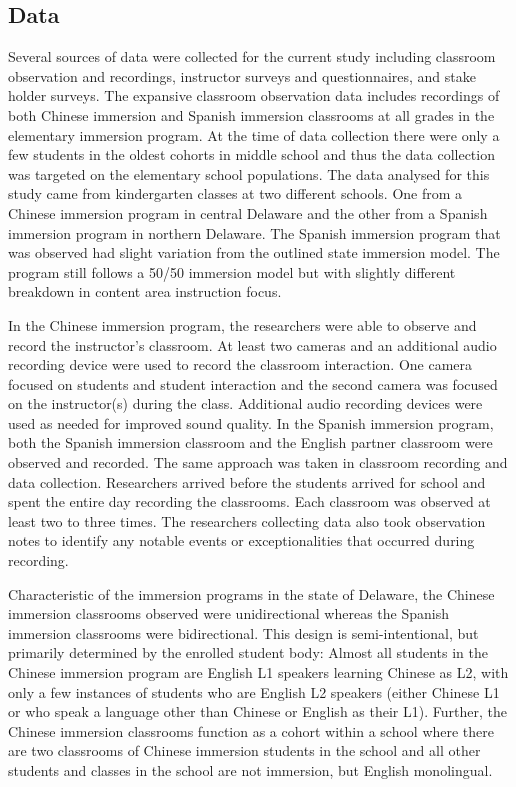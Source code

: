 \documentclass[output=paper,chinesefont]{langscibook}
\begin{document}
\subsection{Data}

Several sources of data were collected for the current study including classroom observation and recordings, instructor surveys and questionnaires, and stake holder surveys. The expansive classroom observation data includes recordings of both Chinese immersion and Spanish immersion classrooms at all grades in the elementary immersion program. At the time of data collection there were only a few students in the oldest cohorts in middle school and thus the data collection was targeted on the elementary school populations. The data analysed for this study came from kindergarten classes at two different schools. One from a Chinese immersion program in central Delaware and the other from a Spanish immersion program in northern Delaware. The Spanish immersion program that was observed had slight variation from the outlined state immersion model. The program still follows a 50/50 immersion model but with slightly different breakdown in content area instruction focus.

In the Chinese immersion program, the researchers were able to observe and record the instructor’s classroom. At least two cameras and an additional audio recording device were used to record the classroom interaction. One camera focused on students and student interaction and the second camera was focused on the instructor(s) during the class.  Additional audio recording devices were used as needed for improved sound quality. In the Spanish immersion program, both the Spanish immersion classroom and the English partner classroom were observed and recorded. The same approach was taken in classroom recording and data collection. Researchers arrived before the students arrived for school and spent the entire day recording the classrooms. Each classroom was observed at least two to three times. The researchers collecting data also took observation notes to identify any notable events or exceptionalities that occurred during recording.

Characteristic of the immersion programs in the state of Delaware, the Chinese immersion classrooms observed were unidirectional whereas the Spanish immersion classrooms were bidirectional. This design is semi-intentional, but primarily determined by the enrolled student body: Almost all students in the Chinese immersion program are English L1 speakers learning Chinese as L2, with only a few instances of students who are English L2 speakers (either Chinese L1 or who speak a language other than Chinese or English as their L1). Further, the Chinese immersion classrooms function as a cohort within a school where there are two classrooms of Chinese immersion students in the school and all other students and classes in the school are not immersion, but English monolingual.
\end{document}
